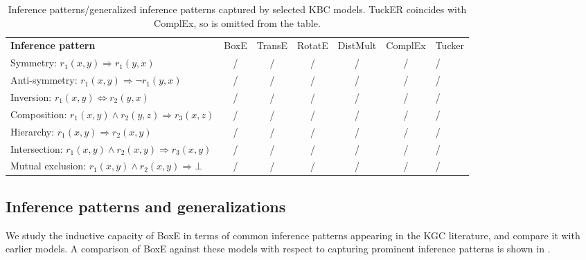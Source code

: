 \documentclass{article}
\begin{document}
\begin{table}[t]
	\centering
	\caption{Inference patterns/generalized inference patterns captured by selected KBC models. TuckER coincides with ComplEx, so is omitted from the table.}
	\begin{tabular}{lc@{\hskip 8pt}c@{\hskip 8pt}c@{\hskip 8pt}c@{\hskip 8pt}cH}
		\toprule
		{\textbf{Inference pattern}} & BoxE & TransE  & RotatE  & DistMult & ComplEx & Tucker\\
		\cmidrule(l){1-7}
		 Symmetry: $r_1(x,y) \Rightarrow r_1(y,x)$ &
		 {\cmark/\cmark} &
		 {\xmark/\xmark} &
		 {\cmark/\cmark} &
		 {\cmark/\cmark} &
		 {\cmark/\cmark} &
		 {\cmark/\cmark}  \\
		 Anti-symmetry: $r_1(x,y)  \Rightarrow \neg r_1(y,x)$ & 
		 {\cmark/\cmark} &  
		 {\cmark/\cmark} &  
		 {\cmark/\cmark} &
		 {\xmark/\xmark} &
		 {\cmark/\cmark} &
		 {\cmark/\cmark}   \\
		 Inversion: $r_1(x,y) \Leftrightarrow r_2(y,x)$  & 
		 {\cmark/\cmark} &  
		 {\cmark/\xmark} &  
		 {\cmark/\cmark} &
		 {\xmark/\xmark} &
		 {\cmark/\cmark} &
		 {\cmark/\cmark}  \\
		 Composition: $r_1(x,y) \land r_2(y,z) \Rightarrow r_3(x,z)$  &  {\xmark/\xmark} & 
		 {\cmark/\xmark} & 
		 {\cmark/\xmark} &  
		 {\xmark/\xmark} &  
		 {\xmark/\xmark} &  
		 {\xmark/\xmark} \\
		Hierarchy: $r_1(x,y) \Rightarrow r_2(x,y)$  & 
		{\cmark/\cmark} &  
		{\xmark/\xmark} &   
		{\xmark/\xmark} &   
		{\cmark/\xmark} &   
		{\cmark/\xmark} &   
		{\cmark/\xmark}  \\
		Intersection: $r_1(x,y) \land r_2(x,y) \Rightarrow r_3(x,y)$   & {\cmark/\cmark} & 
		{\cmark/\xmark} & 
		{\cmark/\xmark} &  
		{\xmark/\xmark} &  
		{\xmark/\xmark} &  
		{\xmark/\xmark}  \\
		Mutual exclusion: $r_1(x,y)   \land  r_2(x,y) \Rightarrow \bot$   & 
		{\cmark/\cmark} & 
		{\cmark/\cmark} &  
		{\cmark/\cmark} &  
		{\cmark/\xmark} &  
		{\cmark/\xmark} &  
		{\cmark/\xmark} \\
		\bottomrule
	\end{tabular}
	\label{tab:infPat}
\end{table}

\subsection{Inference patterns and generalizations}  
We study the inductive capacity of BoxE in terms of common inference patterns appearing in the  KGC literature, and compare it with earlier models. A comparison of BoxE against these models with respect to capturing prominent inference patterns is shown in .
\end{document}
